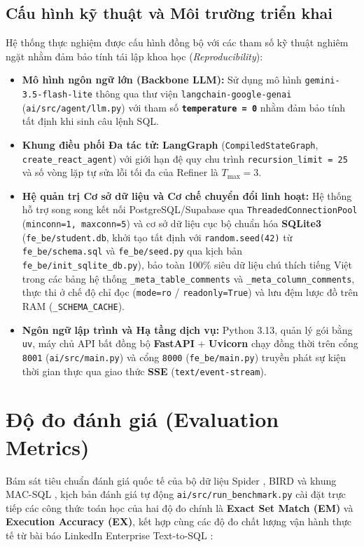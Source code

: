 \documentclass[12pt,a4paper]{report}
\begin{document}
\subsection{Cấu hình kỹ thuật và Môi trường triển khai}

Hệ thống thực nghiệm được cấu hình đồng bộ với các tham số kỹ thuật nghiêm ngặt nhằm đảm bảo tính tái lập khoa học (\textit{Reproducibility}):
\begin{itemize}
    \item \textbf{Mô hình ngôn ngữ lớn (Backbone LLM):} Sử dụng mô hình \texttt{gemini-3.5-flash-lite} thông qua thư viện \texttt{langchain-google-genai} (\texttt{ai/src/agent/llm.py}) với tham số \textbf{\texttt{temperature = 0}} nhằm đảm bảo tính tất định khi sinh câu lệnh SQL.
    \item \textbf{Khung điều phối Đa tác tử:} \textbf{LangGraph} (\texttt{CompiledStateGraph}, \texttt{create\_react\_agent}) với giới hạn đệ quy chu trình \texttt{recursion\_limit = 25} và số vòng lặp tự sửa lỗi tối đa của Refiner là $T_{\max} = 3$.
    \item \textbf{Hệ quản trị Cơ sở dữ liệu và Cơ chế chuyển đổi linh hoạt:} Hệ thống hỗ trợ song song kết nối PostgreSQL/Supabase qua \texttt{ThreadedConnectionPool} (\texttt{minconn=1, maxconn=5}) và cơ sở dữ liệu cục bộ chuẩn hóa \textbf{SQLite3} (\texttt{fe\_be/student.db}, khởi tạo tất định với \texttt{random.seed(42)} từ \texttt{fe\_be/schema.sql} và \texttt{fe\_be/seed.py} qua kịch bản \texttt{fe\_be/init\_sqlite\_db.py}), bảo toàn 100\% siêu dữ liệu chú thích tiếng Việt trong các bảng hệ thống \texttt{\_meta\_table\_comments} và \texttt{\_meta\_column\_comments}, thực thi ở chế độ chỉ đọc (\texttt{mode=ro} / \texttt{readonly=True}) và lưu đệm lược đồ trên RAM (\texttt{\_SCHEMA\_CACHE}).
    \item \textbf{Ngôn ngữ lập trình và Hạ tầng dịch vụ:} Python 3.13, quản lý gói bằng \texttt{uv}, máy chủ API bất đồng bộ \textbf{FastAPI} + \textbf{Uvicorn} chạy đồng thời trên cổng \texttt{8001} (\texttt{ai/src/main.py}) và cổng \texttt{8000} (\texttt{fe\_be/main.py}) truyền phát sự kiện thời gian thực qua giao thức \textbf{SSE} (\texttt{text/event-stream}).
\end{itemize}

\section{Độ đo đánh giá (Evaluation Metrics)}

Bám sát tiêu chuẩn đánh giá quốc tế của bộ dữ liệu Spider \cite{yu2018spider}, BIRD \cite{li2023bird} và khung MAC-SQL \cite{wang2025macsql}, kịch bản đánh giá tự động \texttt{ai/src/run\_benchmark.py} cài đặt trực tiếp các công thức toán học của hai độ đo chính là \textbf{Exact Set Match (EM)} và \textbf{Execution Accuracy (EX)}, kết hợp cùng các độ đo chất lượng vận hành thực tế từ bài báo LinkedIn Enterprise Text-to-SQL \cite{chen2025enterprise}:
\end{document}
